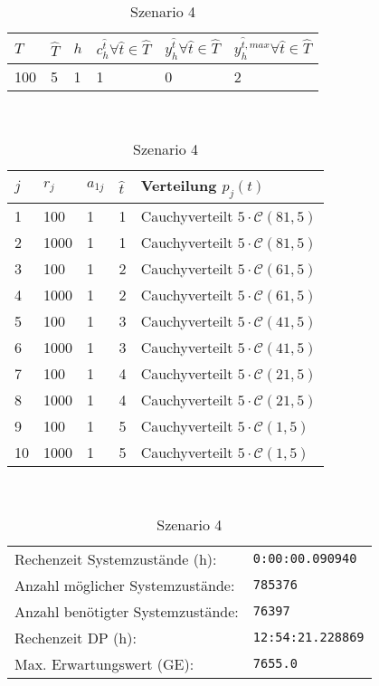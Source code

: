 \begin{table}[h!]
\renewcommand{\arraystretch}{1.5}
  \begin{center}
    \caption{Szenario 4}  \label{S4}
    \vspace*{3mm}
    \begin{tabular}{l l l l l l}   %
    $T$ & $\hat T$  & $h$ & $c_h^{\hat t}\forall \hat{t}\in{\hat T}$ & $y_h^{\hat t}\forall \hat{t}\in{\hat T}$  & $y_h^{{\hat t},max}\forall \hat{t}\in{\hat T}$  \\  \hline
100 & 5 & 1 & 1 & 0 & 2  \\ \hline
    \end{tabular} \\[3mm]
        \begin{tabular}{p{1cm} p{1cm} p{1cm}  p{1cm} p{6cm}}   %
    $j$ & $r_j$  & $a_{1j}$ & $\hat t$ & Verteilung $p_j(t)$ \\  \hline
1 & 100 & 1 & 1 & Cauchyverteilt $5\cdot\mathcal{C}(81, 5)$   \\
2 & 1000 & 1 & 1 & Cauchyverteilt $5\cdot\mathcal{C}(81, 5)$  \\
3 & 100 & 1 & 2 & Cauchyverteilt $5\cdot\mathcal{C}(61, 5)$  \\
4 & 1000 & 1 & 2 & Cauchyverteilt $5\cdot\mathcal{C}(61, 5)$  \\
5 & 100 & 1 & 3 & Cauchyverteilt $5\cdot\mathcal{C}(41, 5)$ \\
6 & 1000 & 1 & 3 & Cauchyverteilt $5\cdot\mathcal{C}(41, 5)$ \\
7 & 100 & 1 & 4 & Cauchyverteilt $5\cdot\mathcal{C}(21, 5)$  \\
8 & 1000 & 1 & 4 & Cauchyverteilt $5\cdot\mathcal{C}(21, 5)$  \\
9 & 100 & 1 & 5 & Cauchyverteilt $5\cdot\mathcal{C}(1, 5)$  \\
10 & 1000 & 1 & 5 & Cauchyverteilt $5\cdot\mathcal{C}(1, 5)$  \\ \hline
    \end{tabular} \\[3mm]
     \begin{tabular}{p{7cm}p{5cm}} \hline
     Rechenzeit Systemzustände (h): & \texttt{0:00:00.090940} \\
     Anzahl möglicher Systemzustände: & \texttt{785376} \\
     Anzahl benötigter Systemzustände: & \texttt{76397} \\ 
     Rechenzeit DP (h): & \texttt{12:54:21.228869} \\ 
          Max. Erwartungswert (GE): & \texttt{7655.0} \\ \hline
         \end{tabular} \\[3mm]
  \end{center}
\end{table}


